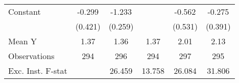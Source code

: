 {\begin{tabular}{l*{5}{c}}
\addlinespace
Constant            &      -0.299         &      -1.233\sym{***}&                     &      -0.562         &      -0.275         \\
                    &     (0.421)         &     (0.259)         &                     &     (0.531)         &     (0.391)         \\
\midrule
Mean Y              &        1.37         &        1.36         &        1.37         &        2.01         &        2.13         \\
Observations        &         294         &         296         &         294         &         297         &         295         \\
Exc. Inst. F-stat   &                     &      26.459         &      13.758         &      26.084         &      31.806         \\
\bottomrule
\end{tabular}
}
